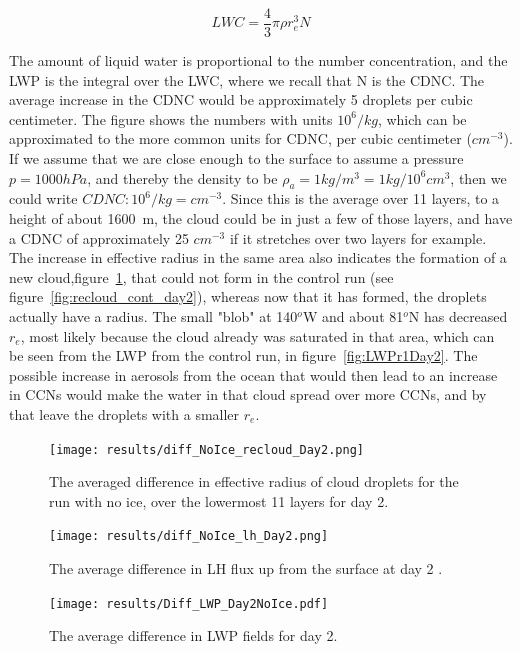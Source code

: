 \begin{equation}
\label{eqn:lwc_prop_cdnc}
LWC = \frac{4}{3}\pi \rho r_e^3 N
\end{equation}

The amount of liquid water is proportional to the number concentration, and the LWP is the integral over the LWC, where we recall that N is the CDNC. The average increase in the CDNC would be approximately 5 droplets per cubic centimeter. The figure shows the numbers with units $10^6/kg$, which can be approximated to the more common units for CDNC, per cubic centimeter ($cm^{-3}$). If we assume that we are close enough to the surface to assume a pressure $p=1000hPa$, and thereby the density to be $\rho_a = 1kg/m^3=1kg/10^6cm^3$, then we could write $CDNC : 10^6/kg = cm^{-3}$. Since this is the average over 11 layers, to a height of about 1600~m, the cloud could be in just a few of those layers, and have a CDNC of approximately 25 $cm^{-3}$ if it stretches over two layers for example. The increase in effective radius in the same area also indicates the formation of a new cloud,figure~\ref{fig:reclouddiff_r2Day2}, that could not form in the control run (see figure~\ref{fig:recloud_cont_day2}), whereas now that it has formed, the droplets actually have a radius. The small "blob" at 140$^o$W and about 81$^o$N has decreased $r_e$, most likely because the cloud already was saturated in that area, which can be seen from the LWP from the control run, in figure~\ref{fig:LWPr1Day2}. The possible increase in aerosols from the ocean that would then lead to an increase in CCNs would make the water in that cloud spread over more CCNs, and by that leave the droplets with a smaller $r_e$.

\begin{figure}
\centering
\texttt{[image: results/diff\_NoIce\_recloud\_Day2.png]}
\caption{The averaged difference in effective radius of cloud droplets for the run with no ice, over the lowermost 11 layers for day 2.}
\label{fig:reclouddiff_r2Day2}
\end{figure}

\begin{figure}
\centering
\texttt{[image: results/diff\_NoIce\_lh\_Day2.png]}
\caption{The average difference in LH flux up from the surface at day 2 .}
\label{fig:lhdiff_r2Day2}
\end{figure}

\begin{figure}
\centering
\texttt{[image: results/Diff\_LWP\_Day2NoIce.pdf]}
\caption{The average difference in LWP fields for day 2.}
\label{fig:LWPdiff_r2Day2}
\end{figure}


